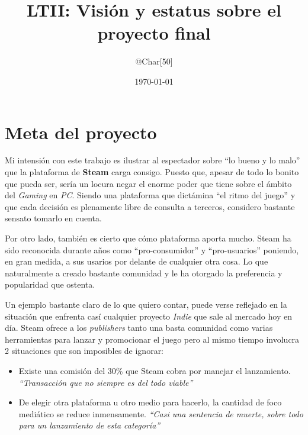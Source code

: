 \documentclass[12pt, letterpaper]{article}
\title{LTII: Visión y estatus sobre el proyecto final}
\author{@Char[50]}
\date{\today}
\begin{document}
\maketitle


\newpage
\section{Meta del proyecto}

\vspace{0.5cm}

Mi intensión con este trabajo es ilustrar al espectador sobre \enquote{lo bueno y lo malo} que la plataforma de \textbf{Steam} carga consigo. Puesto que, apesar de todo lo bonito que pueda ser, sería un locura negar el enorme poder que tiene sobre el ámbito del \textit{Gaming} en \textit{PC}. Siendo una plataforma que dictámina \enquote{el ritmo del juego} y que cada decisión es plenamente libre de consulta a terceros, considero bastante sensato tomarlo en cuenta.

\vspace{0.5cm}

Por otro lado, también es cierto que cómo plataforma aporta mucho. Steam ha sido reconocida durante años como \enquote{pro-consumidor} y \enquote{pro-usuarios} poniendo, en gran medida, a sus usarios por delante de cualquier otra cosa. Lo que naturalmente a creado bastante comunidad y le ha otorgado la preferencia y popularidad que ostenta. 

\vspace{0.5cm}

Un ejemplo bastante claro de lo que quiero contar, puede verse reflejado en la situación que enfrenta casí cualquier proyecto \textit{Indie} que sale al mercado hoy en día. Steam ofrece a los \textit{publishers} tanto una basta comunidad como varias herramientas para lanzar y promocionar el juego pero al mismo tiempo involucra 2 situaciones que son imposibles de ignorar: 
\begin{itemize}
    \item Existe una comisión del 30\% que Steam cobra por manejar el lanzamiento. \textit{\enquote{Transacción que no siempre es del todo viable}}
    \item De elegir otra plataforma u otro medio para hacerlo, la cantidad de foco mediático se reduce inmensamente. \textit{\enquote{Casi una sentencia de muerte, sobre todo para un lanzamiento de esta categoría}}
\end{itemize}
\end{document}
